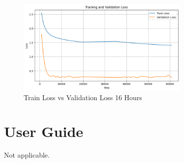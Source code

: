 \documentclass[preprint,11pt,review,authoryear]{elsarticle}
\begin{document}
\begin{figure}[h]
    \centering
    \includegraphics[width=0.75\textwidth]{images/tester.png}
    \caption{Train Loss vs Validation Loss 16 Hours}
    \label{fig:trainvsval}
\end{figure}
\newpage
\section{User Guide} \label{I}
\renewcommand{\thepage}{I\arabic{page}}

Not applicable.
\newpage
\end{document}
